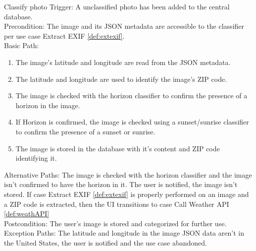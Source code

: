 \documentclass[journal,10pt,draftclsnofoot,onecolumn]{IEEEtran}
\makeatletter
\renewcommand\subsubsection{\@startsection{subsubsection}{3}{\z@}
                                     {-3.25ex\@plus -1ex \@minus -.2ex}
                                     {-1.5ex \@plus -.2ex}
                                     {\normalfont\normalsize\bfseries}}
\makeatother
\begin{document}
\begin{singlespace}
\begin{enumerate}
		\subsubsection{Classify photo} \label{def:classPh}
			Trigger: A unclassified photo has been added to the central database.\\
			Precondition: The image and its JSON metadata are accessible to the classifier per use case Extract EXIF \ref{def:extexif}.\\
			Basic Path:
			\begin{enumerate}
				\item The image's latitude and longitude are read from the JSON metadata.
				\item The latitude and longitude are used to identify the image's ZIP code.
				\item The image is checked with the horizon classifier to confirm the presence of a horizon in the image.
				\item If Horizon is confirmed, the image is checked using a sunset/sunrise classifier to confirm the presence of a sunset or sunrise.
				\item The image is stored in the database with it's content and ZIP code identifying it.
			\end{enumerate}
			Alternative Paths: The image is checked with the horizon classifier and the image isn't confirmed to have the horizon in it. The user is notified, the image isn't stored. If case Extract EXIF \ref{def:extexif} is properly performed on an image and a ZIP code is extracted, then the UI transitions to case Call Weather API \ref{def:weathAPI}\\
			Postcondition: The user's image is stored and categorized for further use.\\
			Exception Paths: The latitude and longitude in the image JSON data aren't in the United States, the user is notified and the use case abandoned.
		

\end{enumerate}
\end{singlespace}
\end{document}
